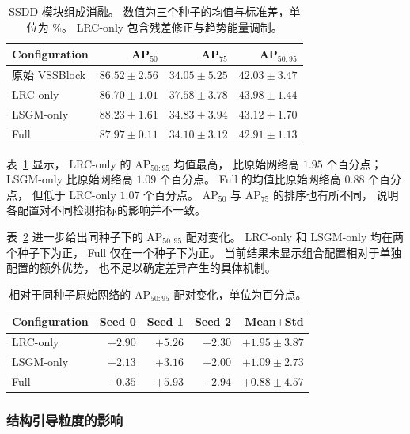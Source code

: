 \documentclass[journal]{IEEEtran}
\begin{document}
\begin{table}[!t]
\centering
\small
\setlength{\tabcolsep}{4pt}
\caption{SSDD 模块组成消融。
数值为三个种子的均值与标准差，单位为 \%。
LRC-only 包含残差修正与趋势能量调制。}
\label{tab:component_ablation}
\begin{tabular}{lrrr}
\toprule
Configuration & AP$_{50}$ & AP$_{75}$ & AP$_{50:95}$ \\
\midrule
原始 VSSBlock
& $86.52\pm2.56$ & $34.05\pm5.25$ & $42.03\pm3.47$ \\
LRC-only
& $86.70\pm1.01$ & $37.58\pm3.78$ & $43.98\pm1.44$ \\
LSGM-only
& $88.23\pm1.61$ & $34.83\pm3.94$ & $43.12\pm1.70$ \\
Full
& $87.97\pm0.11$ & $34.10\pm3.12$ & $42.91\pm1.13$ \\
\bottomrule
\end{tabular}
\end{table}

表~\ref{tab:component_ablation} 显示，
LRC-only 的 AP$_{50:95}$ 均值最高，
比原始网络高 $1.95$ 个百分点；
LSGM-only 比原始网络高 $1.09$ 个百分点。
Full 的均值比原始网络高 $0.88$ 个百分点，
但低于 LRC-only $1.07$ 个百分点。
AP$_{50}$ 与 AP$_{75}$ 的排序也有所不同，
说明各配置对不同检测指标的影响并不一致。

表~\ref{tab:paired_ablation}
进一步给出同种子下的 AP$_{50:95}$ 配对变化。
LRC-only 和 LSGM-only 均在两个种子下为正，
Full 仅在一个种子下为正。
当前结果未显示组合配置相对于单独配置的额外优势，
也不足以确定差异产生的具体机制。

\begin{table}[!t]
\centering
\small
\setlength{\tabcolsep}{4pt}
\caption{相对于同种子原始网络的
AP$_{50:95}$ 配对变化，单位为百分点。}
\label{tab:paired_ablation}
\begin{tabular}{lrrrr}
\toprule
Configuration & Seed 0 & Seed 1 & Seed 2 & Mean$\pm$Std \\
\midrule
LRC-only
& $+2.90$ & $+5.26$ & $-2.30$ & $+1.95\pm3.87$ \\
LSGM-only
& $+2.13$ & $+3.16$ & $-2.00$ & $+1.09\pm2.73$ \\
Full
& $-0.35$ & $+5.93$ & $-2.94$ & $+0.88\pm4.57$ \\
\bottomrule
\end{tabular}
\end{table}

\subsubsection{结构引导粒度的影响}
\label{sec:guidance_granularity}
\end{document}
